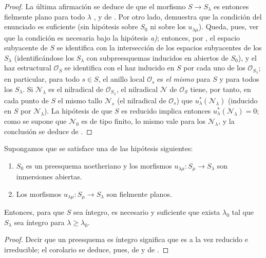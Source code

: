 \begin{proof}
La última afirmación se deduce de que el morfismo $S\to S_\lambda$ es entonces fielmente plano para todo $\lambda$ , y de .
Por otro lado,  demuestra que la condición del enunciado es suficiente (sin hipótesis sobre $S_0$ ni sobre los $u_{\lambda\mu}$).
Queda, pues, ver que la condición es necesaria bajo la hipótesis \emph{a)}; entonces, por , el espacio subyacente de $S$ se identifica con la intersección de los espacios subyacentes de los $S_\lambda$ (identificándose los $S_\lambda$ con subpreesquemas inducidos en abiertos de $S_0$), y el haz estructural $\mathcal O_S$ se identifica con
el haz inducido en $S$ por cada uno de los $\mathcal O_{S_\lambda}$; en particular, para todo $s\in S$, el anillo local $\mathcal O_s$ es \emph{el mismo} para $S$ y para todos los $S_\lambda$.
Si $\mathcal N_\lambda$ es el nilradical de $\mathcal O_{S_\lambda}$, el nilradical $\mathcal N$ de $\mathcal O_S$ tiene, por tanto, en cada punto de $S$ el mismo tallo $\mathcal N_s$ (el nilradical de $\mathcal O_s$) que $u_\lambda^*(\mathcal N_\lambda)$ (inducido en $S$ por $\mathcal N_\lambda$).
La hipótesis de que $S$ es reducido implica entonces $u_\lambda^*(\mathcal N_\lambda)=0$; como se supone que $\mathcal N_0$ es de tipo finito, lo mismo vale para los $\mathcal N_\lambda$, y la conclusión se deduce de .
\end{proof}

\begin{corollary}[8.7.3]
\label{IV.8.7.3-fr}
Supongamos que se satisface \textup{una} de las hipótesis siguientes:
\begin{enumerate}[label=\emph{\alph*)}]
\item $S_0$ es un preesquema noetheriano y los morfismos $u_{\lambda\mu}:S_\mu\to S_\lambda$ son inmersiones abiertas.
\item Los morfismos $u_{\lambda\mu}:S_\mu\to S_\lambda$ son fielmente planos.
\end{enumerate}
Entonces, para que $S$ sea íntegro, es necesario y suficiente que exista $\lambda_0$ tal que $S_\lambda$ sea íntegro para $\lambda\geq\lambda_0$.
\end{corollary}

\begin{proof}
Decir que un preesquema es íntegro significa que es a la vez reducido e irreducible; el corolario se deduce, pues, de  y de .
\end{proof}

